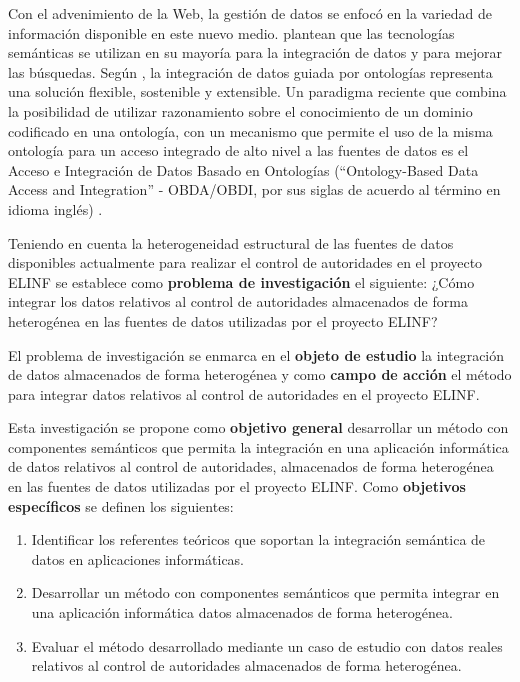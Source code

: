 Con el advenimiento de la Web, la gestión de datos se enfocó en la variedad de información disponible en este nuevo medio. \cite{Janev2011} plantean que las tecnologías semánticas se utilizan en su mayoría para la integración de datos y para mejorar las búsquedas. Según \citep{Hoang2014}, la integración de datos guiada por ontologías representa una solución flexible, sostenible y extensible. Un paradigma reciente que combina la posibilidad de utilizar razonamiento sobre el conocimiento de un dominio codificado en una ontología, con un mecanismo que permite el uso de la misma ontología para un acceso integrado de alto nivel a las fuentes de datos es el Acceso e Integración de Datos Basado en Ontologías (``Ontology-Based Data Access and Integration'' - OBDA/OBDI, por sus siglas de acuerdo al término en idioma inglés) \citep{Calvanese2016,Calvanese2017}.

Teniendo en cuenta la heterogeneidad estructural de las fuentes de datos disponibles actualmente para realizar el control de autoridades en el proyecto ELINF se establece como \textbf{problema de investigación} el siguiente: ¿Cómo integrar los datos relativos al control de autoridades almacenados de forma heterogénea en las fuentes de datos utilizadas por el proyecto ELINF?

El problema de investigación se enmarca en el \textbf{objeto de estudio} la integración de datos almacenados de forma heterogénea y como \textbf{campo de acción} el método para integrar datos relativos al control de autoridades en el proyecto ELINF.

Esta investigación se propone como \textbf{objetivo general} desarrollar un método con componentes semánticos que permita la integración en una aplicación informática de datos relativos al control de autoridades, almacenados de forma heterogénea en las fuentes de datos utilizadas por el proyecto ELINF. Como \textbf{objetivos específicos} se definen los siguientes:

\begin{enumerate}
\item Identificar los referentes teóricos que soportan la integración semántica de datos en aplicaciones informáticas.
\item Desarrollar un método con componentes semánticos que permita integrar en una aplicación informática datos almacenados de forma heterogénea.
\item Evaluar el método desarrollado mediante un caso de estudio con datos reales relativos al control de autoridades almacenados de forma heterogénea.
\end{enumerate}

